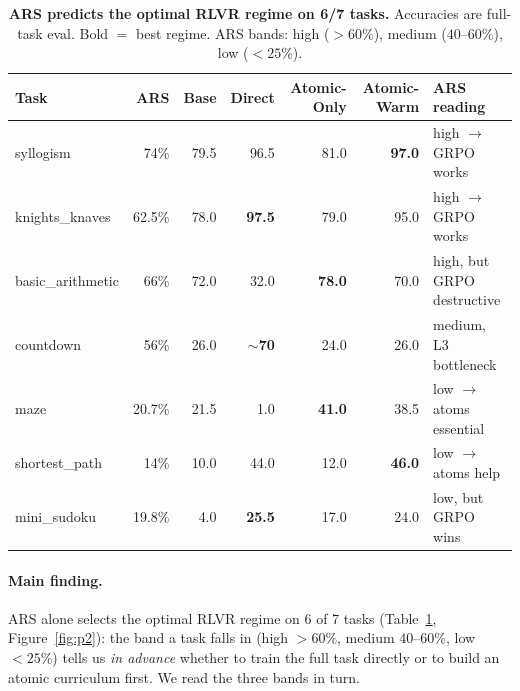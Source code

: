 \documentclass{article}
\newcommand{\cmark}{\ding{51}}
\newcommand{\xmark}{\ding{55}}
\begin{document}
\begin{table}[t]
\centering\small
\caption{\textbf{ARS predicts the optimal RLVR regime on 6/7 tasks.} Accuracies are full-task
eval. Bold $=$ best regime. ARS bands: high ($>60\%$), medium ($40$--$60\%$), low ($<25\%$).}
\label{tab:p2}
\begin{tabular}{lrrrrrl}
\toprule
Task & ARS & Base & Direct & Atomic-Only & Atomic-Warm & ARS reading\\
\midrule
syllogism        & 74\%   & 79.5 & 96.5 & 81.0 & \textbf{97.0} & high $\to$ GRPO works \cmark\\
knights\_knaves  & 62.5\% & 78.0 & \textbf{97.5} & 79.0 & 95.0 & high $\to$ GRPO works \cmark\\
basic\_arithmetic& 66\%   & 72.0 & 32.0 & \textbf{78.0} & 70.0 & high, but GRPO destructive \cmark\\
countdown        & 56\%   & 26.0 & \textbf{$\sim$70} & 24.0 & 26.0 & medium, L3 bottleneck \cmark\\
maze             & 20.7\% & 21.5 & 1.0  & \textbf{41.0} & 38.5 & low $\to$ atoms essential \cmark\\
shortest\_path   & 14\%   & 10.0 & 44.0 & 12.0 & \textbf{46.0} & low $\to$ atoms help \cmark\\
mini\_sudoku     & 19.8\% & 4.0  & \textbf{25.5} & 17.0 & 24.0 & low, but GRPO wins \xmark\\
\bottomrule
\end{tabular}
\end{table}

\paragraph{Main finding.} ARS alone selects the optimal RLVR regime on 6 of 7 tasks
(Table~\ref{tab:p2}, Figure~\ref{fig:p2}): the band a task falls in (high $>60\%$, medium
$40$--$60\%$, low $<25\%$) tells us \emph{in advance} whether to train the full task directly or to
build an atomic curriculum first. We read the three bands in turn.
\end{document}
